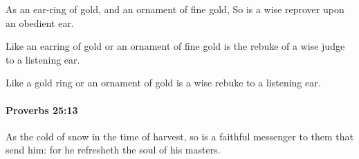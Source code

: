 			\begin{versebox}
					\item[BHS] 
					\item[ASV] As an ear-ring of gold, and an ornament of fine gold, So is a wise reprover upon an obedient ear.
					\item[NIV] Like an earring of gold or an ornament of fine gold is the rebuke of a wise judge to a listening ear.
					\item[NRSV] Like a gold ring or an ornament of gold is a wise rebuke to a listening ear.
			\end{versebox}

		\paragraph{Proverbs 25:13} %
			\label{PROVERBS-25-13}

			As the cold of snow in the time of harvest, so is a faithful messenger to them that send him: for he refresheth the soul of his masters.

